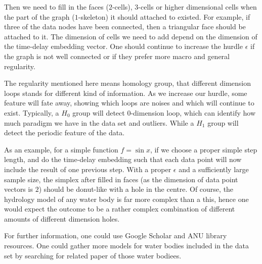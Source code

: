 \documentclass{article}
\begin{document}
Then we need to fill in the faces ($2$-cells), $3$-cells or higher dimensional cells when the part of the graph ($1$-skeleton) it should attached to existed. For example, if three of the data nodes have been connected, then a triangular face should be attached to it. The dimension of cells we need to add depend on the dimension of the time-delay embedding vector. One should continue to increase the hurdle $\epsilon$ if the graph is not well connected or if they prefer more macro and general regularity.

The regularity mentioned here means homology group, that different dimension loops stands for different kind of information. As we increase our hurdle, some feature will fate away, showing which loops are noises and which will continue to exist. Typically, a $H_0$ group will detect $0$-dimension loop, which can identify how much paradigm we have in the data set and outliers. While a $H_1$ group will detect the periodic feature of the data.

As an example, for a simple function $f=\sin x$, if we choose a proper simple step length, and do the time-delay embedding such that each data point will now include the result of one previous step. With a proper $\epsilon$ and a sufficiently large sample size, the simplex after filled in faces (as the dimension of data point vectors is $2$) should be donut-like with a hole in the centre. Of course, the hydrology model of any water body is far more complex than a this, hence one would expect the outcome to be a rather complex combination of different amounts of different dimension holes.

For further information, one could use Google Scholar and ANU library resources. One could gather more models for water bodies included in the data set by searching for related paper of those water bodiees.



\end{document}
